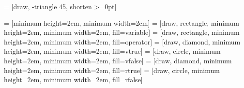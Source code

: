 \beamertemplatenavigationsymbolsempty

\usepackage{tikz}
\usepackage{amsmath}
\usepackage{amssymb}
\usepackage{mathtools}

\usetikzlibrary{positioning}
\usetikzlibrary{backgrounds}
\usetikzlibrary{tikzmark}
\usetikzlibrary{shapes,arrows,calc}

\newcommand{\highlight}[2]{\colorbox{#1}{$\mathstrut #2$}}


 = [draw, -triangle 45, shorten >=0pt]

 = [minimum height=2em, minimum width=2em]
 = [draw, rectangle, minimum height=2em, minimum width=2em, fill=variable]
 = [draw, rectangle, minimum height=2em, minimum width=2em, fill=operator]
 = [draw, diamond, minimum height=2em, minimum width=2em, fill=vtrue]
 = [draw, circle, minimum height=2em, minimum width=2em, fill=vfalse]
 = [draw, diamond, minimum height=2em, minimum width=2em, fill=rtrue]
 = [draw, circle, minimum height=2em, minimum width=2em, fill=rfalse]



